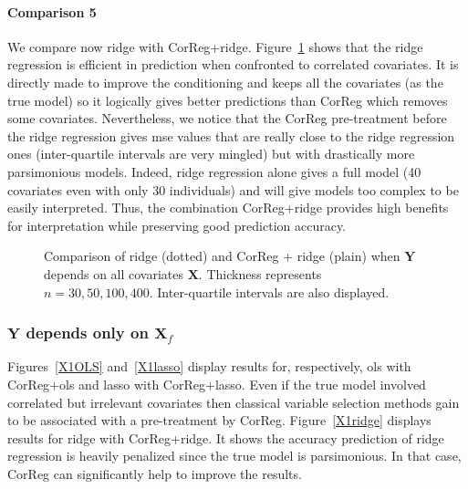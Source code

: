 \documentclass[11pt,a4paper]{article}
\begin{document}
\paragraph{Comparison 5} We compare now ridge with {\sc CorReg}+ridge. Figure~\ref{toutridge} shows that the ridge regression is efficient in prediction when confronted to correlated covariates. It is directly made to improve the conditioning and keeps all the covariates (as the true model) so it logically gives better predictions than {\sc CorReg} which removes some covariates. Nevertheless, we notice that the {\sc CorReg} pre-treatment before the ridge regression gives {\sc mse} values that are really close to the ridge regression ones (inter-quartile intervals are very mingled) but with drastically more parsimonious models. Indeed, ridge regression alone gives a full model (40 covariates even with only 30 individuals) and will give models too complex to be easily interpreted. Thus, the combination {\sc CorReg}+ridge provides high benefits for interpretation while preserving good prediction accuracy.

 \begin{figure}[h!]
	 \quad
	\caption{Comparison of ridge (dotted) and {\sc CorReg} + ridge (plain)  when $\boldsymbol{Y}$ depends on all covariates ${\boldsymbol{X}}$. Thickness represents $n=30,50,100,400$.  Inter-quartile intervals are also displayed.}\label{toutridge}
\end{figure}


\subsubsection{$\boldsymbol{Y}$ depends only on $\boldsymbol{X}_f$}	 \label{tableMSEsimdroit}

Figures~\ref{X1OLS} and~\ref{X1lasso} display results for, respectively, {\sc ols} with {\sc CorReg}+{\sc ols} and {\sc lasso} with {\sc CorReg}+{\sc lasso}. Even if the true model involved correlated but irrelevant covariates then classical variable selection methods gain to be associated with a pre-treatment by {\sc CorReg}. Figure~\ref{X1ridge} displays results for {\sc ridge} with {\sc CorReg}+{\sc ridge}. It shows the accuracy prediction of ridge regression is heavily penalized since the true model is parsimonious. In that case, {\sc CorReg} can significantly help to improve the results.
\end{document}
